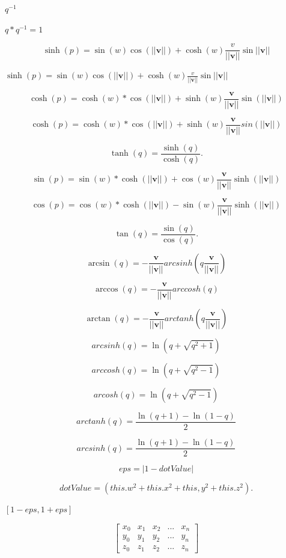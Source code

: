 \documentclass{article}
\begin{document}
$q^{-1}$
\pagebreak

$q * q^{-1} = 1$
\pagebreak

\[\sinh(p) = \sin(w)\cos(||\boldsymbol{v}||) + \cosh(w)\frac{v}{||\boldsymbol{v}||}\sin||\boldsymbol{v}||\]
\pagebreak

$\sinh(p) = \sin(w)\cos(||\boldsymbol{v}||) + \cosh(w)\frac{v}{||\boldsymbol{v}||}\sin||\boldsymbol{v}||$
\pagebreak

\[\cosh(p) = \cosh(w) * \cos(||\boldsymbol{v}||) + \sinh(w)\frac{\boldsymbol{v}}{||\boldsymbol{v}||}\sin(||\boldsymbol{v}||)\]
\pagebreak

\[\cosh(p) = \cosh(w) * \cos(||\boldsymbol{v}||) + \sinh(w)\frac{\boldsymbol{v}}{||\boldsymbol{v}||}sin(||\boldsymbol{v}||)\]
\pagebreak

\[ \tanh(q) = \frac{\sinh(q)}{\cosh(q)}.\]
\pagebreak

\[\sin(p) = \sin(w) * \cosh(||\boldsymbol{v}||) + \cos(w)\frac{\boldsymbol{v}}{||\boldsymbol{v}||}\sinh(||\boldsymbol{v}||)\]
\pagebreak

\[\cos(p) = \cos(w) * \cosh(||\boldsymbol{v}||) - \sin(w)\frac{\boldsymbol{v}}{||\boldsymbol{v}||}\sinh(||\boldsymbol{v}||)\]
\pagebreak

\[\tan(q) = \frac{\sin(q)}{\cos(q)}.\]
\pagebreak

\[\arcsin(q) = -\frac{\boldsymbol{v}}{||\boldsymbol{v}||}arcsinh(q\frac{\boldsymbol{v}}{||\boldsymbol{v}||})\]
\pagebreak

\[\arccos(q) = -\frac{\boldsymbol{v}}{||\boldsymbol{v}||}arccosh(q)\]
\pagebreak

\[\arctan(q) = -\frac{\boldsymbol{v}}{||\boldsymbol{v}||}arctanh(q\frac{\boldsymbol{v}}{||\boldsymbol{v}||})\]
\pagebreak

\[arcsinh(q) = \ln(q + \sqrt{q^2 + 1})\]
\pagebreak

\[arccosh(q) = \ln(q + \sqrt{q^2 - 1})\]
\pagebreak

\[arcosh(q) = \ln(q + \sqrt{q^2 - 1})\]
\pagebreak

\[arctanh(q) = \frac{\ln(q + 1) - \ln(1 - q)}{2}\]
\pagebreak

\[arcsinh(q) = \frac{\ln(q + 1) - \ln(1 - q)}{2}\]
\pagebreak

\[eps = |1 - dotValue|\]
\pagebreak

\[dotValue = (this.w^2 + this.x^2 + this,y^2 + this.z^2).\]
\pagebreak

$[1-eps, 1+eps]$
\pagebreak

\[\begin{bmatrix}
       x_0& x_1& x_2&...&x_n\\
       y_0& y_1& y_2&...&y_n\\
       z_0& z_1& z_2&...&z_n
       \end{bmatrix}\]
\pagebreak
\end{document}
